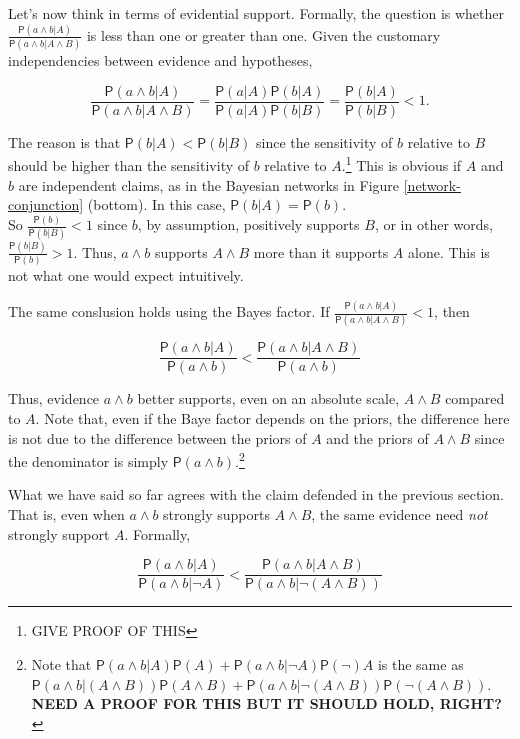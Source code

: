 \documentclass[
  10pt,
  dvipsnames,enabledeprecatedfontcommands]{scrartcl}
\newcommand{\pr}[1]{\mathsf{P}(#1)}
\begin{document}
Let's now think in terms of evidential support. Formally, the question
is whether
\(\frac{\pr{a\wedge b \vert A}}{\pr{a\wedge b \vert A \wedge B}}\) is
less than one or greater than one. Given the customary independencies
between evidence and hypotheses,

\[\frac{\pr{a\wedge b \vert A}}{\pr{a\wedge b \vert A \wedge B}}=\frac{\pr{a \vert A} \pr{b \vert A}}{\pr{a \vert A} \pr{b \vert B}}=\frac{\pr{b \vert A}}{\pr{b \vert B}}<1.\]

\noindent The reason is that \(\pr{b \vert A} < \pr{b \vert B}\) since
the sensitivity of \(b\) relative to \(B\) should be higher than the
sensitivity of \(b\) relative to \(A\).\footnote{GIVE PROOF OF THIS}
This is obvious if \(A\) and \(b\) are independent claims, as in the
Bayesian networks in Figure \ref{network-conjunction} (bottom). In this
case, \(\pr{b \vert A}=\pr{b}\).\\
So \(\frac{\pr{b}}{\pr{b \vert B}}<1\) since \(b\), by assumption,
positively supports \(B\), or in other words,
\(\frac{\pr{b \vert B}}{\pr{b}}>1\). Thus, \(a\wedge b\) supports
\(A\wedge B\) more than it supports \(A\) alone. This is not what one
would expect intuitively.

The same conslusion holds using the Bayes factor. If
\(\frac{\pr{a\wedge b \vert A}}{\pr{a\wedge b \vert A \wedge B}}<1\),
then

\[\frac{\pr{a\wedge b \vert A}}{\pr{a\wedge b}} < \frac{\pr{a\wedge b \vert A \wedge B}}{\pr{a\wedge b}}   \]

\noindent Thus, evidence \(a\wedge b\) better supports, even on an
absolute scale, \(A \wedge B\) compared to \(A\). Note that, even if the
Baye factor depends on the priors, the difference here is not due to the
difference between the priors of \(A\) and the priors of \(A\wedge B\)
since the denominator is simply
\(\pr{a\wedge b}\).\footnote{Note that $\pr{a\wedge b \vert A}\pr{A}+ \pr{a\wedge b \vert \neg A}\pr\neg {A}$ is the same as $\pr{a\wedge b \vert (A\wedge B)}\pr{A\wedge B}+ \pr{a\wedge b \vert \neg (A\wedge B)}\pr{\neg (A\wedge B)}$. \textbf{NEED A PROOF FOR THIS BUT IT SHOULD HOLD, RIGHT?}}

What we have said so far agrees with the claim defended in the previous
section. That is, even when \(a\wedge b\) strongly supports
\(A \wedge B\), the same evidence need \textit{not} strongly support
\(A\). Formally,

\[\frac{\pr{a\wedge b \vert A}}{\pr{a\wedge b \vert \neg A}} < \frac{\pr{a\wedge b \vert A \wedge B}}{\pr{a\wedge b \vert \neg (A \wedge B)}}\]
\end{document}
